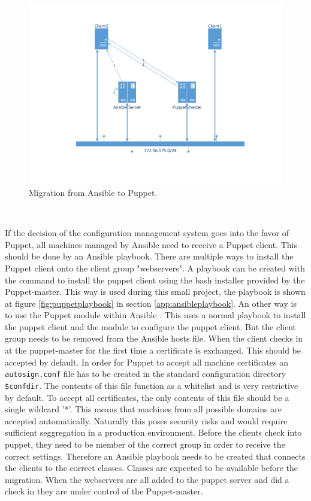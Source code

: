 \begin{figure}[!hb]
        \includegraphics[scale=0.5]{img/AnsibletoPuppet.pdf}
        \caption{Migration from Ansible to Puppet.}
        \label{fig:situation2}
\end{figure}

\begin{lstlisting}
    
\end{lstlisting}


If the decision of the configuration management system goes into the favor of Puppet, all machines managed by Ansible need to receive a Puppet client. This should be done by an Ansible playbook. There are multiple ways to install the Puppet client onto the client group "webservers". A playbook can be created with the command to install the puppet client using the bash installer provided by the Puppet-master. This way is used during this small project, the playbook is shown at figure \ref{fig:puppetplaybook} in section \ref{app:ansibleplaybook}. An other way is to use the Puppet module within Ansible \cite{ansiblepuppet}. This uses a normal playbook to install the puppet client and the module to configure the puppet client. But the client group needs to be removed from the Ansible hosts file. When the client checks in at the puppet-master for the first time a certificate is exchanged. This should be accepted by default. In order for Puppet to accept all machine certificates an \texttt{autosign.conf} file has to be created in the standard configuration directory \texttt{\$confdir}. The contents of this file function as a whitelist and is very restrictive by default. To accept all certificates, the only contents of this file should be a single wildcard '*'. This means that machines from all possible domains are accepted automatically. Naturally this poses security risks and would require sufficient seggregation in a production environment.
Before the clients check into puppet, they need to be member of the correct group in order to receive the correct settings. Therefore an Ansible playbook needs to be created that connects the clients to the correct classes. Classes are expected to be available before the migration. When the webservers are all added to the puppet server and did a check in they are under control of the Puppet-master.

